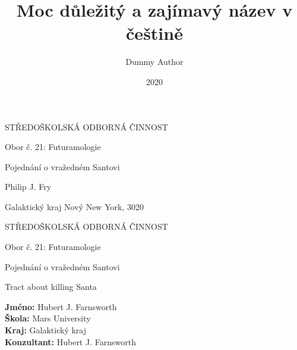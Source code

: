 \documentclass[12pt, a4paper,s
 twoside,        %
 openright
]{report}
\title{Moc důležitý a zajímavý název v češtině} %
\author{Dummy Author} %
\date{2020} %
\begin{document}
\pagestyle{empty}

\begin{titlepage}
    \bfseries{ %
        \begin{center}
            \LARGE{STŘEDOŠKOLSKÁ ODBORNÁ ČINNOST}

            \vspace{14pt}
            \large{ %
                Obor č. 21: Futuramologie %
            } %

            \vspace{0.4 \textheight}

            \LARGE{ %
                Pojednání o vražedném Santovi
            }%

            \vspace{0.4\textheight}
        \end{center}
        
        \noindent\Large{Philip J. Fry}  %

        \noindent\Large{Galaktický kraj   Nový New York, 3020} %
        
            
    } %
\end{titlepage}

\cleardoublepage

{\bfseries %
    \begin{center}
        \LARGE{STŘEDOŠKOLSKÁ ODBORNÁ ČINNOST}

        \vspace{14pt}
        {\large %
            Obor č. 21: Futuramologie %
        } %

        \vspace{0.3 \textheight}

        \LARGE{ %
        Pojednání o vražedném Santovi
        }

        \LARGE{ %
        Tract about killing Santa
        }%

        \vspace{0.24\textheight}
    \end{center}  
}%
{\Large %
    \noindent\textbf{Jméno:} Hubert J. Farnsworth\\
    \textbf{Škola:} Mars University\\
    \textbf{Kraj:} Galaktický kraj\\
    \textbf{Konzultant:} Hubert J. Farnsworth\\
} %
\end{document}
